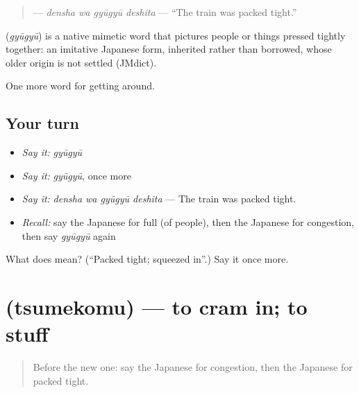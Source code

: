 \begin{quote}
\textbf{ } — \emph{densha wa gyūgyū deshita} — \textquotedblleft{}The train was packed tight.\textquotedblright{}
\end{quote}

\begin{cousinweb}
\textbf{} (\emph{gyūgyū}) is a native mimetic word that pictures people or things pressed tightly together: an imitative Japanese form, inherited rather than borrowed, whose older origin is not settled (JMdict).
\end{cousinweb}

\begin{grammarlens}[title={What you've built}]
One more word for getting around.
\end{grammarlens}

\subsection*{Your turn}
\begin{itemize}
\raggedright
  \item \emph{Say it:} \emph{gyūgyū}
  \item \emph{Say it:} \emph{gyūgyū}, once more
  \item \emph{Say it:} \emph{densha wa gyūgyū deshita} — The train was packed tight.
  \item \emph{Recall:} say the Japanese for full (of people), then the Japanese for congestion, then say \emph{gyūgyū} again
\end{itemize}

\begin{tcolorbox}[breakable,colback=teal!4,colframe=teal!35!black,title={Before you move on}]
What does  mean? (\textquotedblleft{}Packed tight; squeezed in\textquotedblright{}.) Say it once more.
\end{tcolorbox}
\section[\texorpdfstring{\ja{つめこむ} (tsumekomu)}{つめこむ (tsumekomu)}]{ (tsumekomu) — to cram in; to stuff}

\label{lesson:JA-C378-tsumekomu}



\begin{quote}
Before the new one: say the Japanese for congestion, then the Japanese for packed tight.
\end{quote}

